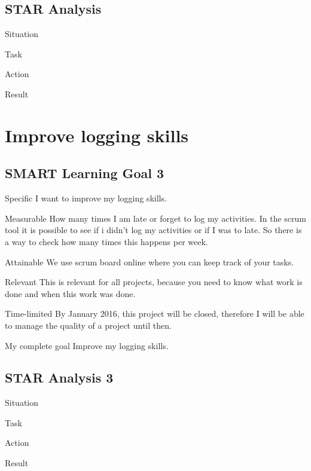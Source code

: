 \documentclass[12pt]{article}
\begin{document}
	\subsection{STAR Analysis}
	\begin{STAR}
	    \item[Situation]
	    \item[Task]
	    \item[Action]
	    \item[Result]
	\end{STAR}
	
	\section{Improve logging skills}
	
	\subsection{SMART Learning Goal 3}
	\begin{SMART}
	    \item[Specific] I want to improve my logging skills.
	    \item[Measurable] How many times I am late or forget to log my activities. In the scrum tool it is possible to see if i didn't log my activities or if I was to late. So there is a way to check how many times this happens per week.
	    \item[Attainable] We use scrum board online where you can keep track of your tasks.
	    \item[Relevant] This is relevant for all projects, because you need to know what work is done and when this work was done.
	    \item[Time-limited] By January 2016, this project will be closed, therefore I will be able to manage the quality of a project until then.
	    \item[My complete goal] Improve my logging skills.
	\end{SMART}
	
	\subsection{STAR Analysis 3}
	\begin{STAR}
	    \item[Situation]
	    \item[Task]
	    \item[Action]
	    \item[Result]
	\end{STAR}
	
	
	
	
	
\end{document}

